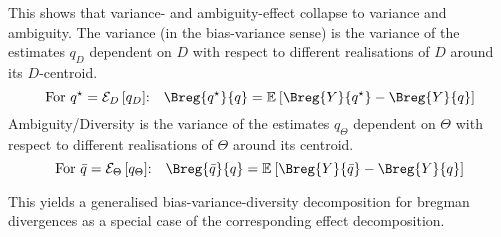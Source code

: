 \documentclass[../main.tex]{subfiles}
\begin{document}

This shows that variance- and ambiguity-effect collapse to variance and ambiguity. The variance (in the bias-variance sense) is the variance of the estimates $q_D$ dependent on $D$ with respect to different realisations of $D$ around its $D$-centroid. 
$$
\text{For $q^\star = \mathcal{E}_D\left[q_D\right]$:}\hspace{1em}
\Breg{q^\star}{q} = \mathbb{E}_{}\left[ \Breg{Y}{q^\star} - \Breg{Y}{q} \right]
$$
Ambiguity/Diversity is the variance of the estimates $q_\Theta$ dependent on $\Theta$ with respect to different realisations of $\Theta$ around its centroid.
$$
\text{For $\bar{q} = \mathcal{E}_\Theta\left[q_\Theta\right]$:}\hspace{1em}
\Breg{\bar{q}}{q} = \mathbb{E}_{}\left[ \Breg{Y}{\bar{q}} - \Breg{Y}{q} \right]
$$


This yields a generalised bias-variance-diversity decomposition for bregman divergences as a special case of the corresponding effect decomposition.

\end{document}
